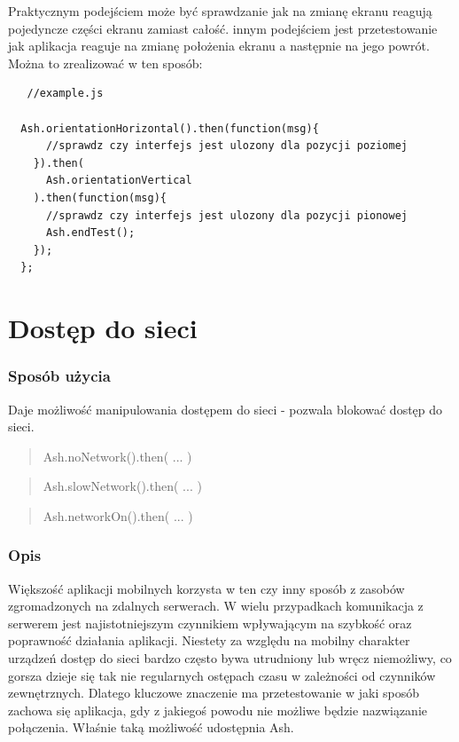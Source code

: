 \documentclass[brudnopis]{xmgr}
\begin{document}
Praktycznym podejściem może być sprawdzanie jak na zmianę ekranu reagują pojedyncze części ekranu zamiast całość. innym podejściem jest przetestowanie jak aplikacja reaguje na zmianę położenia ekranu a następnie na jego powrót. Można to zrealizować w ten sposób:

\begin{lstlisting}
   //example.js

  Ash.orientationHorizontal().then(function(msg){
      //sprawdz czy interfejs jest ulozony dla pozycji poziomej
    }).then(
      Ash.orientationVertical
    ).then(function(msg){
      //sprawdz czy interfejs jest ulozony dla pozycji pionowej
      Ash.endTest();
    });
  };
\end{lstlisting}

\section{Dostęp do sieci}

\subsubsection{Sposób użycia}

Daje możliwość manipulowania dostępem do sieci - pozwala blokować dostęp do sieci.

\begin{quote}
Ash.noNetwork().then( ... ) 
\end{quote}

\begin{quote}
Ash.slowNetwork().then( ... ) 
\end{quote}

\begin{quote}
Ash.networkOn().then( ... ) 
\end{quote}

\subsubsection{Opis}

Większość aplikacji mobilnych korzysta w ten czy inny sposób z zasobów zgromadzonych na zdalnych serwerach. W wielu przypadkach komunikacja z serwerem jest najistotniejszym  czynnikiem wpływającym na szybkość oraz poprawność działania aplikacji. Niestety za względu na mobilny charakter urządzeń dostęp do sieci bardzo często bywa utrudniony lub wręcz niemożliwy, co gorsza dzieje się tak nie regularnych ostępach czasu w zależności od czynników zewnętrznych. Dlatego kluczowe znaczenie ma przetestowanie w jaki sposób zachowa się aplikacja, gdy z jakiegoś powodu nie możliwe będzie nazwiązanie połączenia. Właśnie taką możliwość udostępnia Ash. 
\end{document}

